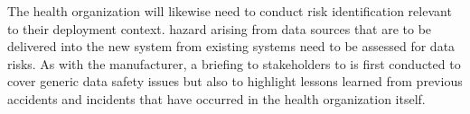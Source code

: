 \begin{minipage}[t]{0.73\textwidth}
  The health organization will likewise need to conduct risk identification relevant to their deployment context. \Gls{hazard} arising from data sources that are to be delivered into the new system from existing systems need to be assessed for data risks.
  As with the manufacturer, a briefing to \glspl{stakeholder} to  is first conducted to cover generic data safety issues but also to highlight lessons learned from previous accidents and incidents that have occurred in the health organization itself.
\end{minipage}
\begin{minipage}[t]{0.25\textwidth}
  \centering{}
\end{minipage}

